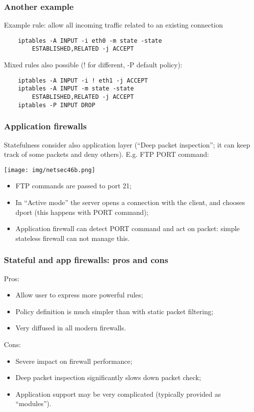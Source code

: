 \documentclass[a4paper, 10pt, titlepage]{article}
\begin{document}
\subsubsection*{Another example} %
Example rule: allow all incoming traffic related to an existing connection
\begin{lstlisting}
	iptables -A INPUT -i eth0 -m state -state
		ESTABLISHED,RELATED -j ACCEPT
\end{lstlisting}
Mixed rules also possible (! for different, -P default policy):
\begin{lstlisting}
	iptables -A INPUT -i ! eth1 -j ACCEPT
	iptables -A INPUT -m state -state
		ESTABLISHED,RELATED -j ACCEPT
	iptables -P INPUT DROP
\end{lstlisting}

\subsubsection*{Application firewalls}
Statefulness consider also application layer (“Deep packet inspection”; it can keep track of some packets and deny others). E.g. FTP PORT command:\medskip\\
\begin{minipage}{0.4\textwidth} 
\begin{center}
	\texttt{[image: img/netsec46b.png]}
\end{center}
\end{minipage}
\hfill 
\begin{minipage}{0.55\textwidth}
	\begin{itemize}
		\item FTP commands are passed to port 21;
		\item In “Active mode” the server opens a connection with the client, and chooses dport (this happens with PORT command);
		\item Application firewall can detect PORT command and act on packet: simple stateless firewall can not manage this.
	\end{itemize}
\end{minipage}

\subsubsection*{Stateful and app firewalls: pros and cons}
Pros:
\begin{itemize}
	\item Allow user to express more powerful rules;
	\item Policy definition is much simpler than with static packet filtering;
	\item Very diffused in all modern firewalls.
\end{itemize}
Cons:
\begin{itemize}
	\item Severe impact on firewall performance;
	\item Deep packet inspection significantly slows down packet check;
	\item Application support may be very complicated (typically provided as “modules”).
\end{itemize}
\end{document}
